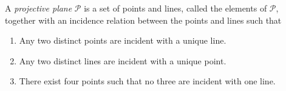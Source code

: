 A \textit{projective plane} $\mathcal{P}$ is a set of points and lines, called the elements of $\mathcal{P}$, together with an incidence relation between the points and lines such that

\begin{enumerate}
  \item[(i)] Any two distinct points are incident with a unique line.
  \item[(ii)] Any two distinct lines are incident with a unique point.
  \item[(iii)] There exist four points such that no three are incident with one line.
\end{enumerate}
